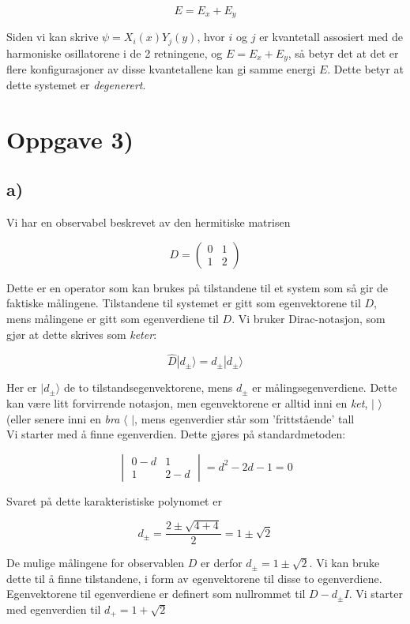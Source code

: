 \documentclass[a4paper,norsk, 10pt]{article}
\numberwithin{equation}{section}
\begin{document}
$$
E = E_x +E_y
$$

Siden vi kan skrive $\psi = X_i(x)Y_j(y)$, hvor $i$ og $j$ er kvantetall assosiert med de harmoniske osillatorene i de 2 retningene, og $E = E_x + E_y$, så betyr det at det er flere konfigurasjoner av disse kvantetallene kan gi samme energi $E$. Dette betyr at dette systemet er \textit{degenerert}.

\newpage

\section{Oppgave 3)}

\subsection*{a)}
Vi har en observabel beskrevet av den hermitiske matrisen

\begin{equation}
D =
\begin{pmatrix}
0 &1\\
1 &2
\end{pmatrix}
\end{equation}

Dette er en operator som kan brukes på tilstandene til et system som så gir de faktiske målingene. Tilstandene til systemet er gitt som egenvektorene til $D$, mens målingene er gitt som egenverdiene til $D$. Vi bruker Dirac-notasjon, som gjør at dette skrives  som \textit{keter}:

$$
\hat{D}|d_{\pm}\rangle = d_{\pm}|d_{\pm}\rangle
$$

Her er $|d_{\pm}\rangle$ de to tilstandsegenvektorene, mens $d_{\pm}$ er målingsegenverdiene. Dette kan være litt forvirrende notasjon, men egenvektorene er alltid inni en \textit{ket}, $|$ $\rangle$(eller senere inni en \textit{bra} $\langle$ $|$, mens egenverdier står som  'frittstående' tall\\

Vi starter med å finne egenverdien. Dette gjøres på standardmetoden:

$$
\begin{vmatrix}
0 - d & 1\\
1 & 2-d
\end{vmatrix}
= d^2 - 2d - 1 = 0
$$

Svaret på dette karakteristiske polynomet er 

$$
d_{\pm} = \frac{2 \pm \sqrt{4 + 4}}{2} = 1\pm \sqrt{2}
$$

De mulige målingene for observablen $D$ er derfor $d_{\pm} = 1 \pm \sqrt{2}$. Vi kan bruke dette til å finne tilstandene, i form av egenvektorene til disse to egenverdiene. Egenvektorene til egenverdiene er definert som nullrommet til $D - d_{\pm}I$. Vi starter med egenverdien til $d_+ = 1 + \sqrt{2}$
\end{document}
